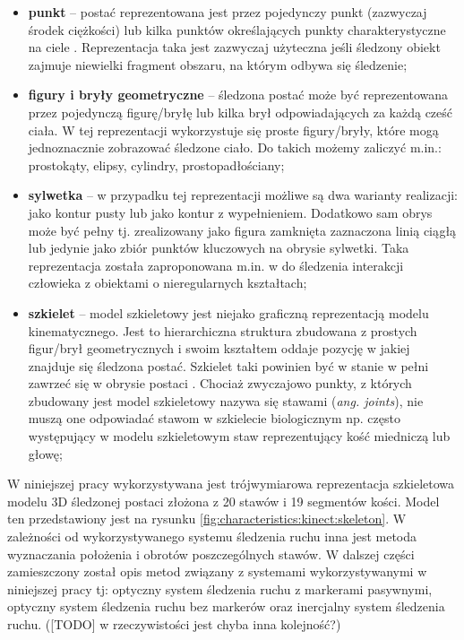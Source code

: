 	\begin{itemize}
		\item \textbf{punkt} -- postać reprezentowana jest przez pojedynczy punkt (zazwyczaj środek ciężkości) \cite{Veenman2001} lub kilka punktów określających punkty charakterystyczne na ciele \cite{Serby2004}. Reprezentacja taka jest zazwyczaj użyteczna jeśli śledzony obiekt zajmuje niewielki fragment obszaru, na którym odbywa się śledzenie;
		\item \textbf{figury i bryły geometryczne} -- śledzona postać może być reprezentowana przez pojedynczą figurę/bryłę \cite{Comaniciu2003} lub kilka brył odpowiadających za każdą cześć ciała. W tej reprezentacji wykorzystuje się proste figury/bryły, które mogą jednoznacznie zobrazować śledzone ciało. Do takich możemy zaliczyć m.in.: prostokąty, elipsy, cylindry, prostopadłościany;
		\item \textbf{sylwetka} -- w przypadku tej reprezentacji możliwe są dwa warianty realizacji: jako kontur pusty lub jako kontur z wypełnieniem. Dodatkowo sam obrys może być pełny tj. zrealizowany jako figura zamknięta zaznaczona linią ciągłą lub jedynie jako zbiór punktów kluczowych na obrysie sylwetki. Taka reprezentacja została zaproponowana m.in. w \cite{Yilmaz2004} do śledzenia interakcji człowieka z obiektami o nieregularnych kształtach;
		\item \textbf{szkielet} -- model szkieletowy jest niejako graficzną reprezentacją modelu kinematycznego. Jest to hierarchiczna struktura zbudowana z prostych figur/brył geometrycznych i swoim kształtem oddaje pozycję w jakiej znajduje się śledzona postać. Szkielet taki powinien być w stanie w pełni zawrzeć się w obrysie postaci \cite{Ali2001}. Chociaż zwyczajowo punkty, z których zbudowany jest model szkieletowy nazywa się stawami (\emph{ang. joints}), nie muszą one odpowiadać stawom w szkielecie biologicznym np. często występujący w modelu szkieletowym staw reprezentujący kość miedniczą lub głowę;
	\end{itemize}
	
	\vspace{2cm}
	W niniejszej pracy wykorzystywana jest trójwymiarowa reprezentacja szkieletowa modelu 3D śledzonej postaci złożona z 20 stawów i 19 segmentów kości. Model ten przedstawiony jest na rysunku \ref{fig:characteristics:kinect:skeleton}. W zależności od wykorzystywanego systemu śledzenia ruchu inna jest metoda wyznaczania położenia i obrotów poszczególnych stawów. W dalszej części zamieszczony został opis metod związany z systemami wykorzystywanymi w niniejszej pracy tj: optyczny system śledzenia ruchu z markerami pasywnymi, optyczny system śledzenia ruchu bez markerów oraz inercjalny system śledzenia ruchu. ([TODO] w rzeczywistości jest chyba inna kolejność?)
		

